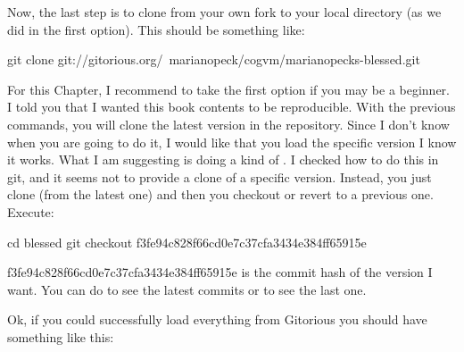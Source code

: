 \documentclass[a4paper,10pt,twoside]{book}
\begin{document}
Now, the last step is to clone from your own fork to your local directory (as we did in the first option). This should be something like:

\begin{code}{}
git clone git://gitorious.org/~marianopeck/cogvm/marianopecks-blessed.git
\end{code}

For this Chapter, I recommend to take the first option if you may be a beginner. I told you that I wanted this book contents to be reproducible. With the previous commands, you will clone the latest version in the repository. Since I don't know when you are going to do it, I would like that you load the specific version I know it works. What I am suggesting is doing a kind of . I checked how to do this in git, and it seems not to provide a clone of a specific version. Instead, you just clone (from the latest one) and then you checkout or revert to a previous one. Execute:

\begin{code}{}
cd blessed
git checkout f3fe94c828f66cd0e7c37cfa3434e384ff65915e
\end{code}

f3fe94c828f66cd0e7c37cfa3434e384ff65915e is the commit hash of the version I want. 
You can do  to see the latest commits or  to see the last one.

Ok, if you could successfully load everything from Gitorious you should have something like this:

\end{document}
